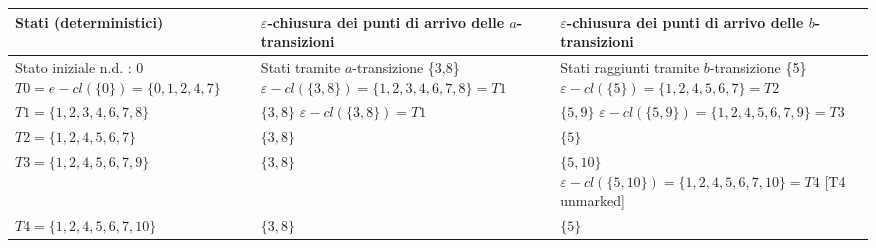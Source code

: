 \documentclass{standalone}
\providecommand\lightrule{%
	\arrayrulecolor{black!30}%
	\midrule[\lightrulewidth]%
	\arrayrulecolor{black}}
\begin{document}
\begin{tabularx}{\textwidth}{X|X|X}
		Stati (deterministici) & \(\varepsilon\)-chiusura dei punti di arrivo delle \(a\)-transizioni & \(\varepsilon\)-chiusura dei punti di arrivo delle \(b\)-transizioni \\
    \midrule
        Stato iniziale n.d. : 0 \newline
        \(T0 = e-cl(\{0\}) = \{0, 1, 2, 4, 7\}\)
        &
        Stati tramite \(a\)-transizione \{3,8\} \newline
        \(\varepsilon-cl(\{3,8\}) = \{1,2,3,4,6,7,8\} = T1\) \newline
        [T1 unmarked]
        &
        Stati raggiunti tramite \(b\)-transizione \{5\} \newline
        \(\varepsilon-cl(\{5\}) = \{1,2,4,5,6,7\} = T2\) \newline
        [T2 unmarked]
        \\ \lightrule
        \(T1 = \{1,2,3,4,6,7,8\}\)
        &
        \(\{3, 8\}\) \newline
        \(\varepsilon-cl(\{3,8\}) = T1\) 
        &
        \(\{5, 9\}\) \newline
        \(\varepsilon-cl(\{5,9\}) = \{1,2,4,5,6,7,9\} = T3\) \newline
        [T3 unmarked]
        \\ \lightrule
        \(T2 = \{1,2,4,5,6,7\}\)
        &
        \(\{3,8\}\) 
        &
        \(\{5\}\) 
        \\ \lightrule
        \(T3 = \{1,2,4,5,6,7,9\}\)
        &
        \(\{3,8\}\) 
        &
        \(\{5, 10\}\) \newline
        \(\varepsilon-cl(\{5, 10\}) = \{1,2,4,5,6,7,10\} = T4\)
        [T4 unmarked]
        \\ \lightrule
        \(T4 = \{1,2,4,5,6,7,10\}\)
        &
        \(\{3,8\}\) 
        &
        \(\{5\}\) 
        \\
\end{tabularx}
\end{document}
